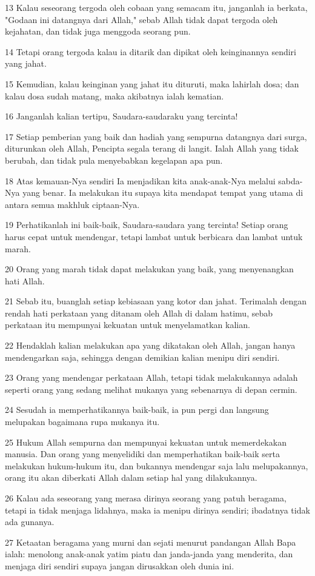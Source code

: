 \par 13 Kalau seseorang tergoda oleh cobaan yang semacam itu, janganlah ia berkata, "Godaan ini datangnya dari Allah," sebab Allah tidak dapat tergoda oleh kejahatan, dan tidak juga menggoda seorang pun.
\par 14 Tetapi orang tergoda kalau ia ditarik dan dipikat oleh keinginannya sendiri yang jahat.
\par 15 Kemudian, kalau keinginan yang jahat itu dituruti, maka lahirlah dosa; dan kalau dosa sudah matang, maka akibatnya ialah kematian.
\par 16 Janganlah kalian tertipu, Saudara-saudaraku yang tercinta!
\par 17 Setiap pemberian yang baik dan hadiah yang sempurna datangnya dari surga, diturunkan oleh Allah, Pencipta segala terang di langit. Ialah Allah yang tidak berubah, dan tidak pula menyebabkan kegelapan apa pun.
\par 18 Atas kemauan-Nya sendiri Ia menjadikan kita anak-anak-Nya melalui sabda-Nya yang benar. Ia melakukan itu supaya kita mendapat tempat yang utama di antara semua makhluk ciptaan-Nya.
\par 19 Perhatikanlah ini baik-baik, Saudara-saudara yang tercinta! Setiap orang harus cepat untuk mendengar, tetapi lambat untuk berbicara dan lambat untuk marah.
\par 20 Orang yang marah tidak dapat melakukan yang baik, yang menyenangkan hati Allah.
\par 21 Sebab itu, buanglah setiap kebiasaan yang kotor dan jahat. Terimalah dengan rendah hati perkataan yang ditanam oleh Allah di dalam hatimu, sebab perkataan itu mempunyai kekuatan untuk menyelamatkan kalian.
\par 22 Hendaklah kalian melakukan apa yang dikatakan oleh Allah, jangan hanya mendengarkan saja, sehingga dengan demikian kalian menipu diri sendiri.
\par 23 Orang yang mendengar perkataan Allah, tetapi tidak melakukannya adalah seperti orang yang sedang melihat mukanya yang sebenarnya di depan cermin.
\par 24 Sesudah ia memperhatikannya baik-baik, ia pun pergi dan langsung melupakan bagaimana rupa mukanya itu.
\par 25 Hukum Allah sempurna dan mempunyai kekuatan untuk memerdekakan manusia. Dan orang yang menyelidiki dan memperhatikan baik-baik serta melakukan hukum-hukum itu, dan bukannya mendengar saja lalu melupakannya, orang itu akan diberkati Allah dalam setiap hal yang dilakukannya.
\par 26 Kalau ada seseorang yang merasa dirinya seorang yang patuh beragama, tetapi ia tidak menjaga lidahnya, maka ia menipu dirinya sendiri; ibadatnya tidak ada gunanya.
\par 27 Ketaatan beragama yang murni dan sejati menurut pandangan Allah Bapa ialah: menolong anak-anak yatim piatu dan janda-janda yang menderita, dan menjaga diri sendiri supaya jangan dirusakkan oleh dunia ini.

